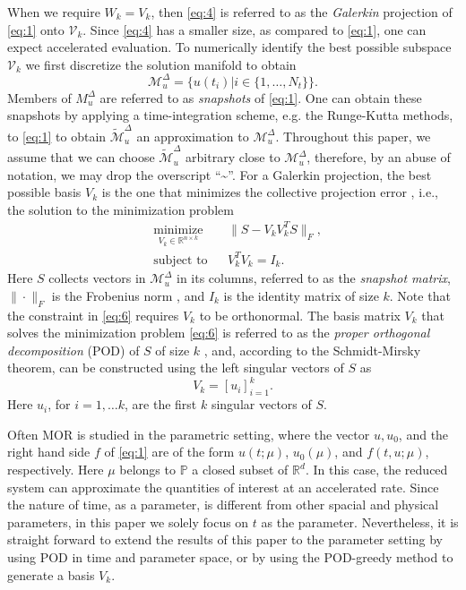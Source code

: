When we require $W_k=V_k$, then \eqref{eq:4} is referred to as the \emph{Galerkin} projection of \eqref{eq:1} onto $\mathcal V_k$. Since \eqref{eq:4} has a smaller size, as compared to \eqref{eq:1}, one can expect accelerated evaluation. To numerically identify the best possible subspace $\mathcal V_{k}$ we first discretize the solution manifold to obtain
\begin{equation} \label{eq:5}
	\mathcal M_{u}^{\Delta} = \{ u(t_i) | i\in \{ 1,\dots,N_t \} \}.
\end{equation}
Members of $M_{u}^{\Delta}$ are referred to as \emph{snapshots} of \eqref{eq:1}. One can obtain these snapshots by applying a time-integration scheme, e.g. the Runge-Kutta methods, to \eqref{eq:1} to obtain $\tilde {\mathcal M}_{u}^{\Delta}$ an approximation to $\mathcal M_{u}^{\Delta}$. Throughout this paper, we assume that we can choose $\tilde{\mathcal M}_{u}^{\Delta}$ arbitrary close to $\mathcal M_{u}^{\Delta}$, therefore, by an abuse of notation, we may drop the overscript ``\textasciitilde''. For a Galerkin projection, the best possible basis $V_k$ is the one that minimizes the collective projection error \cite{hesthaven2015certified}, i.e., the solution to the minimization problem
\begin{equation} \label{eq:6}
\begin{aligned}
&  \underset{V_k\in\mathbb R^{n\times k}}{\text{minimize}}
& &  \| S - V_kV_k^TS\|_F, \\
& \text{subject to}
& & V_k^TV_k=I_k.
\end{aligned}
\end{equation}
Here $S$ collects vectors in $\mathcal M_{u}^{\Delta}$ in its columns, referred to as the \emph{snapshot matrix}, $\|\cdot \|_F$ is the Frobenius norm \cite{trefethen97}, and $I_{k}$ is the identity matrix of size $k$. Note that the constraint in \eqref{eq:6} requires $V_k$ to be orthonormal. The basis matrix $V_k$ that solves the minimization problem \eqref{eq:6} is referred to as the \emph{proper orthogonal decomposition} (POD) of $S$ of size $k$ \cite{hesthaven2015certified}, and, according to the Schmidt-Mirsky theorem, can be constructed using the left singular vectors of $S$ as
\begin{equation}
	V_{k} = [u_i]_{i=1}^{k}.
\end{equation}
Here $u_i$, for $i=1,\dots k$, are the first $k$ singular vectors of $S$.

Often MOR is studied in the parametric setting, where the vector $u,u_0$, and the right hand side $f$ of \eqref{eq:1} are of the form $u(t;\mu)$, $u_0(\mu)$, and $f(t,u;\mu)$, respectively. Here $\mu$ belongs to $\mathbb P$ a closed subset of $\mathbb R^d$. In this case, the reduced system can approximate the quantities of interest at an accelerated rate. Since the nature of time, as a parameter, is different from other spacial and physical parameters, in this paper we solely focus on $t$ as the parameter. Nevertheless, it is straight forward to extend the results of this paper to the parameter setting by using POD in time and parameter space, or by using the POD-greedy \cite{haasdonk2013convergence,hesthaven2015certified,quarteroni2015reduced} method to generate a basis $V_k$.

